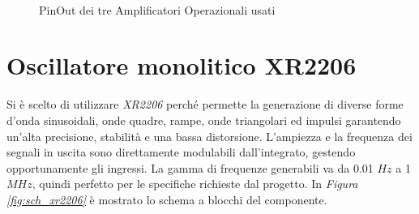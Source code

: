 \documentclass[titlepage]{report}
\begin{document}
	\begin{figure}[H]
		\centering
		 \qquad
		 \qquad 
		 \\
		\caption{PinOut dei tre Amplificatori Operazionali usati}
		\label{fig:pinout_OpAmp}
	\end{figure}

	
\section{Oscillatore monolitico XR2206}
	\label{sec:XR2206}
	
	Si è scelto di utilizzare \textit{XR2206} perché permette la generazione di diverse forme d'onda sinusoidali, onde quadre, rampe, onde triangolari ed impulsi garantendo un'alta precisione, stabilità e una bassa distorsione. L'ampiezza e la frequenza dei segnali in uscita sono direttamente modulabili dall'integrato, gestendo opportunamente gli ingressi. La gamma di frequenze generabili va da 0.01 $Hz$ a 1 $MHz$, quindi perfetto per le specifiche richieste dal progetto. 
	In \textit{Figura \ref{fig:sch_xr2206}} è mostrato lo schema a blocchi del componente.
	
\end{document}
